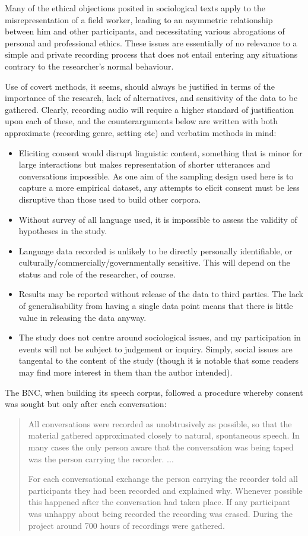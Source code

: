 Many of the ethical objections posited in sociological texts apply to the misrepresentation of a field worker, leading to an asymmetric relationship between him and other participants, and necessitating various abrogations of personal and professional ethics. These issues are essentially of no relevance to a simple and private recording process that does not entail entering any situations contrary to the researcher’s normal behaviour.

Use of covert methods, it seems, should always be justified in terms of the importance of the research, lack of alternatives, and sensitivity of the data to be gathered. Clearly, recording audio will require a higher standard of justification upon each of these, and the counterarguments below are written with both approximate (recording genre, setting etc) and verbatim methods in mind:

\begin{itemize}
    \item Eliciting consent would disrupt linguistic content, something that is minor for large interactions but makes representation of shorter utterances and conversations impossible. As one aim of the sampling design used here is to capture a more empirical dataset, any attempts to elicit consent must be less disruptive than those used to build other corpora.
    \item Without survey of all language used, it is impossible to assess the validity of hypotheses in the study.
    \item Language data recorded is unlikely to be directly personally identifiable, or culturally/commercially/governmentally sensitive. This will depend on the status and role of the researcher, of course.
    \item Results may be reported without release of the data to third parties. The lack of generalisability from having a single data point means that there is little value in releasing the data anyway.
    \item The study does not centre around sociological issues, and my participation in events will not be subject to judgement or inquiry. Simply, social issues are tangental to the content of the study (though it is notable that some readers may find more interest in them than the author intended).
\end{itemize}


The BNC, when building its speech corpus, followed a procedure whereby consent was sought but only after each conversation:
\begin{quote}
All conversations were recorded as unobtrusively as possible, so that the material gathered approximated closely to natural, spontaneous speech. In many cases the only person aware that the conversation was being taped was the person carrying the recorder. ...

For each conversational exchange the person carrying the recorder told all participants they had been recorded and explained why. Whenever possible this happened after the conversation had taken place. If any participant was unhappy about being recorded the recording was erased. During the project around 700 hours of recordings were gathered.
\end{quote}

